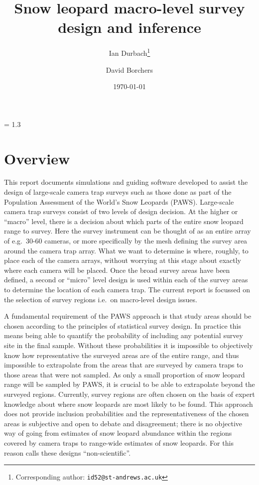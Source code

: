 \documentclass[a4paper,11pt]{article} %
\begin{document}
\baselineskip = 1.3\baselineskip 
\title{Snow leopard macro-level survey design and inference}
\author[1]{Ian Durbach\footnote{Corresponding author: \texttt{id52@st-andrews.ac.uk}}}
\author[1]{David Borchers}
\date{\today}
\maketitle


\tableofcontents

\section{Overview}
This report documents simulations and guiding software developed to assist the design of large-scale camera trap surveys such as those done as part of the Population Assessment of the World's Snow Leopards (PAWS). Large-scale camera trap surveys consist of two levels of design decision. At the higher or ``macro'' level, there is a decision about which parts of the entire snow leopard range to survey. Here the survey instrument can be thought of as an entire array of e.g.\ 30-60 cameras, or more specifically by the mesh defining the survey area around the camera trap array. What we want to determine is where, roughly, to place each of the camera arrays, without worrying at this stage about exactly where each camera will be placed. Once the broad survey areas have been defined, a second or ``micro'' level design is used within each of the survey areas to determine the location of each camera trap. The current report is focussed on the selection of survey regions i.e.\ on macro-level design issues.

A fundamental requirement of the PAWS approach is that study areas should be chosen according to the principles of statistical survey design. In practice this means being able to quantify the probability of including any potential survey site in the final sample. Without these probabilities it is impossible to objectively know how representative the surveyed areas are of the entire range, and thus impossible to extrapolate from the areas that are surveyed by camera traps to those areas that were not sampled. As only a small proportion of snow leopard range will be sampled by PAWS, it is crucial to be able to extrapolate beyond the surveyed regions. Currently, survey regions are often chosen on the basis of expert knowledge about where snow leopards are most likely to be found. This approach does not provide inclusion probabilities and the representativeness of the chosen areas is subjective and open to debate and disagreement; there is no objective way of going from estimates of snow leopard abundance within the regions covered by camera traps to range-wide estimates of snow leopards. For this reason \cite{McDonald2012} calls these designs ``non-scientific''.
\end{document}
